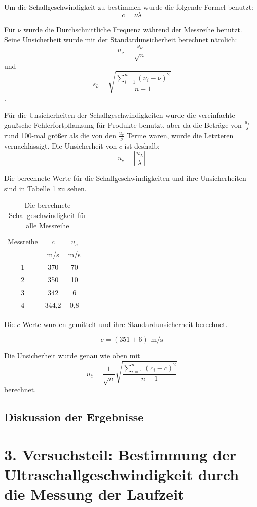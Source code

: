 \documentclass[11pt,a4paper]{article}
\begin{document}
Um die Schallgeschwindigkeit zu bestimmen wurde die folgende Formel benutzt:
$$ c = \nu\lambda$$

Für $\nu$ wurde die Durchschnittliche Frequenz während der Messreihe benutzt. Seine Unsicherheit wurde mit der Standardunsicherheit berechnet nämlich:
$$ u_\nu = \frac{s_\nu}{\sqrt{n}}$$
und
$$ s_{\bar{\nu}} = \sqrt{\frac{\sum_{i=1}^{n}(\nu_i-\bar{\nu})^2}{n-1}}$$.

Für die Unsicherheiten der Schallgeschwindigkeiten wurde die vereinfachte gaußsche Fehlerfortpflanzung für Produkte benutzt, aber da die Beträge von $\frac{u_\lambda}{\lambda}$ rund 100-mal größer als die von den $\frac{u_\nu}{\nu}$ Terme waren, wurde die Letzteren vernachlässigt. Die Unsicherheit von $c$ ist deshalb:
$$ u_c = \left| \frac{u_\lambda}{\lambda}\right|$$

Die berechnete Werte für die Schallgeschwindigkeiten und ihre Unsicherheiten sind in Tabelle \ref{Table2} zu sehen.

\begin{table}[h]
	\centering
	\begin{tabular*}{0.50\textwidth}{@{\extracolsep{\fill}}cccc}
		\toprule
		Messreihe & $c$ & $u_c$ \\
		& m/s&m/s\\
		1 & 370 & 70 \\
		2 & 350 & 10 \\
		3 & 342 & 6 \\
		4 & 344,2 & 0,8 \\
		\bottomrule
	\end{tabular*}
	\caption{Die berechnete Schallgeschwindigkeit für alle Messreihe}
	\label{Table2}
\end{table}

Die $c$ Werte wurden gemittelt und ihre Standardunsicherheit berechnet. 

$$ c = (351 \pm 6) \textrm{ m/s}$$

Die Unsicherheit wurde genau wie oben mit
$$u_{\bar{c}} = \frac{1}{\sqrt{n}} \sqrt{\frac{\sum_{i=1}^{n}(c_i-\bar{c})^2}{n-1}}$$
berechnet. 




\subsection{Diskussion der Ergebnisse}

\section{3. Versuchsteil: Bestimmung der Ultraschallgeschwindigkeit durch die Messung der Laufzeit}
\end{document}
